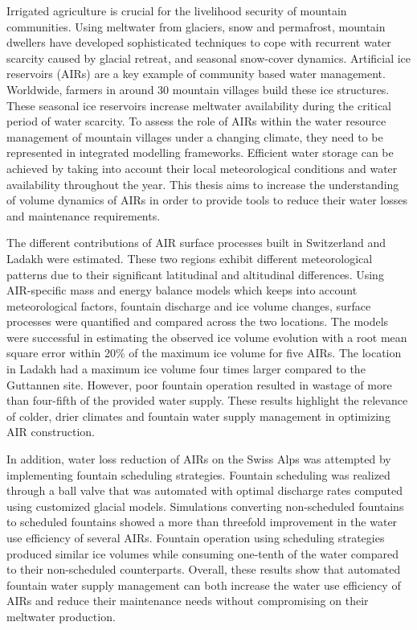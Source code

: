 \label{sec:summary}

Irrigated agriculture is crucial for the livelihood security of mountain communities. Using meltwater from
glaciers, snow and permafrost, mountain dwellers have developed sophisticated techniques to cope with recurrent
water scarcity caused by glacial retreat, and seasonal snow-cover dynamics. Artificial ice
reservoirs (AIRs) are a key example of community based water management. Worldwide, farmers in around 30 mountain
villages build these ice structures. These seasonal ice reservoirs increase meltwater availability during the
critical period of water scarcity. To assess the role of AIRs within the water resource management of
mountain villages under a changing climate, they need to be represented in integrated modelling frameworks.
Efficient water storage can be achieved by taking into account their local meteorological conditions and
water availability throughout the year. This thesis aims to increase the understanding of volume dynamics of
AIRs in order to provide tools to reduce their water losses and maintenance requirements.

The different contributions of AIR surface processes built in Switzerland and Ladakh were estimated. These two
regions exhibit different meteorological patterns due to their significant latitudinal and altitudinal
differences. Using AIR-specific mass and energy balance models which keeps into account meteorological factors,
fountain discharge and ice volume changes, surface processes were quantified and compared across the two
locations. The models were successful in estimating the observed ice volume evolution with a root mean square
error within 20\% of the maximum ice volume for five AIRs. The location in Ladakh had a maximum ice volume four
times larger compared to the Guttannen site. However, poor fountain operation resulted in wastage of more than
four-fifth of the provided water supply. These results highlight the relevance of colder, drier climates and
fountain water supply management in optimizing AIR construction.

In addition, water loss reduction of AIRs on the Swiss Alps was attempted by implementing fountain scheduling
strategies. Fountain scheduling was realized through a ball valve that was automated with optimal discharge
rates computed using customized glacial models. Simulations converting non-scheduled fountains to scheduled
fountains showed a more than threefold improvement in the water use efficiency of several AIRs. Fountain
operation using scheduling strategies produced similar ice volumes while consuming one-tenth of the water
compared to their non-scheduled counterparts.  Overall, these results show that automated fountain water supply
management can both increase the water use efficiency of AIRs and reduce their maintenance needs without
compromising on their meltwater production.

